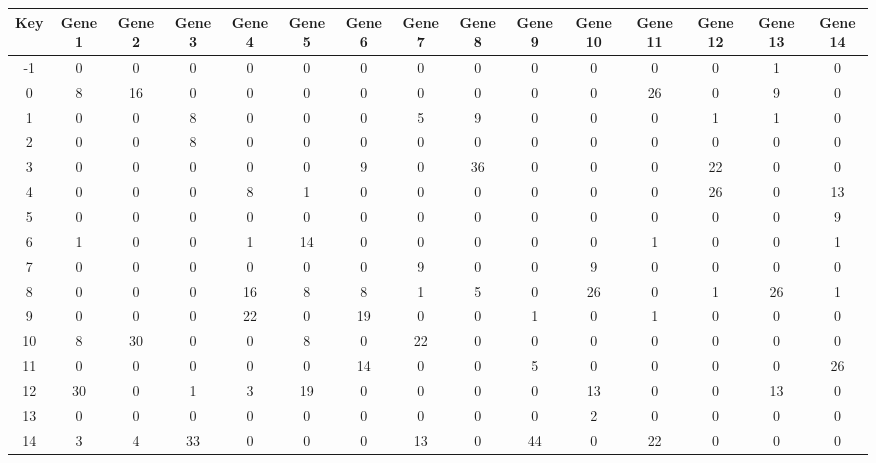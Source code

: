 \begin{tabular}{|c|c|c|c|c|c|c|c|c|c|c|c|c|c|c|}
\hline
Key & Gene 1 & Gene 2 & Gene 3 & Gene 4 & Gene 5 & Gene 6 & Gene 7 & Gene 8 & Gene 9 & Gene 10 & Gene 11 & Gene 12 & Gene 13 & Gene 14 \\
\hline
-1 & 0 & 0 & 0 & 0 & 0 & 0 & 0 & 0 & 0 & 0 & 0 & 0 & 1 & 0 \\
0 & 8 & 16 & 0 & 0 & 0 & 0 & 0 & 0 & 0 & 0 & 26 & 0 & 9 & 0 \\
1 & 0 & 0 & 8 & 0 & 0 & 0 & 5 & 9 & 0 & 0 & 0 & 1 & 1 & 0 \\
2 & 0 & 0 & 8 & 0 & 0 & 0 & 0 & 0 & 0 & 0 & 0 & 0 & 0 & 0 \\
3 & 0 & 0 & 0 & 0 & 0 & 9 & 0 & 36 & 0 & 0 & 0 & 22 & 0 & 0 \\
4 & 0 & 0 & 0 & 8 & 1 & 0 & 0 & 0 & 0 & 0 & 0 & 26 & 0 & 13 \\
5 & 0 & 0 & 0 & 0 & 0 & 0 & 0 & 0 & 0 & 0 & 0 & 0 & 0 & 9 \\
6 & 1 & 0 & 0 & 1 & 14 & 0 & 0 & 0 & 0 & 0 & 1 & 0 & 0 & 1 \\
7 & 0 & 0 & 0 & 0 & 0 & 0 & 9 & 0 & 0 & 9 & 0 & 0 & 0 & 0 \\
8 & 0 & 0 & 0 & 16 & 8 & 8 & 1 & 5 & 0 & 26 & 0 & 1 & 26 & 1 \\
9 & 0 & 0 & 0 & 22 & 0 & 19 & 0 & 0 & 1 & 0 & 1 & 0 & 0 & 0 \\
10 & 8 & 30 & 0 & 0 & 8 & 0 & 22 & 0 & 0 & 0 & 0 & 0 & 0 & 0 \\
11 & 0 & 0 & 0 & 0 & 0 & 14 & 0 & 0 & 5 & 0 & 0 & 0 & 0 & 26 \\
12 & 30 & 0 & 1 & 3 & 19 & 0 & 0 & 0 & 0 & 13 & 0 & 0 & 13 & 0 \\
13 & 0 & 0 & 0 & 0 & 0 & 0 & 0 & 0 & 0 & 2 & 0 & 0 & 0 & 0 \\
14 & 3 & 4 & 33 & 0 & 0 & 0 & 13 & 0 & 44 & 0 & 22 & 0 & 0 & 0 \\
\hline
\end{tabular}